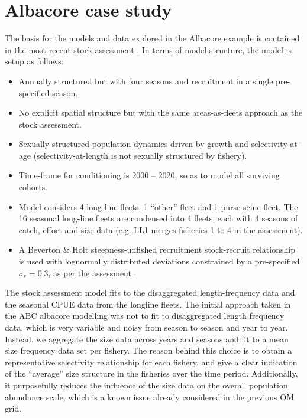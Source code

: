 \documentclass[11pt]{article}
\begin{document}
\section{Albacore case study}

The basis for the models and data explored in the Albacore example is contained in the most recent stock assessment \cite{albsa}. In terms of model structure, the model is setup as follows:

\begin{itemize}
    \item Annually structured but with four seasons and recruitment in a single pre-specified season.
    \item No explicit spatial structure but with the same areas-as-fleets approach as the stock assessment.
    \item Sexually-structured population dynamics driven by growth and selectivity-at-age (selectivity-at-length is not sexually structured by fishery).
    \item Time-frame for conditioning is 2000 -- 2020, so as to model all surviving cohorts.
    \item Model considers 4 long-line fleets, 1 ``other'' fleet and 1 purse seine fleet. The 16 seasonal long-line fleets are condensed into 4 fleets, each with 4 seasons of catch, effort and size data (e.g. LL1 merges fisheries 1 to 4 in the assessment).
    \item A Beverton \& Holt steepness-unfished recruitment stock-recruit relationship is used with lognormally distributed deviations constrained by a pre-specified $\sigma_r=0.3$, as per the assessment \cite{albsa}.
\end{itemize}

The stock assessment model fits to the disaggregated length-frequency data and the seasonal CPUE data from the longline fleets. The initial approach taken in the ABC albacore modelling was not to fit to disaggregated length frequency data, which is very variable and noisy from season to season and year to year. Instead, we aggregate the size data across years and seasons and fit to a mean size frequency data set per fishery. The reason behind this choice is to obtain a representative selectivity relationship for each fishery, and give a clear indication of the ``average'' size structure in the fisheries over the time period. Additionally, it purposefully reduces the influence of the size data on the overall population abundance scale, which is a known issue already considered in the previous OM grid.
\end{document}
